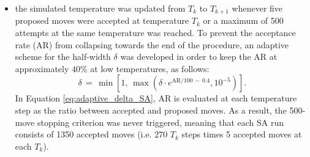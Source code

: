 \begin{itemize}[label=$\blacktriangleright$]
    terminated as soon as $T_k$ fell below $5 \cdot 10^{-6}$, namely after 270 temperature steps.
    \item the simulated temperature was updated from $T_k$ to $T_{k+1}$ whenever five proposed moves were accepted at temperature $T_{k}$ or a maximum of 
    500 attempts at the same temperature was reached. To prevent the acceptance rate (AR) from collapsing towards the end of the procedure, an adaptive 
    scheme for the half-width $\delta$ was developed in order to keep the AR at approximately $40 \%$ at low temperatures, as follows:
    \begin{equation}
        \delta\,=\,\min\left[1,\,\max\left(\delta \cdot e^{\text{AR}/100\,-\,0.4}, 10^{-5}\right)\right].
        \label{eq:adaptive_delta_SA}
    \end{equation}
    In Equation \eqref{eq:adaptive_delta_SA}, $\text{AR}$ is evaluated at each temperature step as the ratio between accepted and proposed moves. As a 
    result, the 500-move stopping criterion was never triggered, meaning that each SA run consists of 1350 accepted moves (i.e. 270 $T_{k}$ steps times 
    5 accepted moves at each $T_{k}$).  
\end{itemize}

